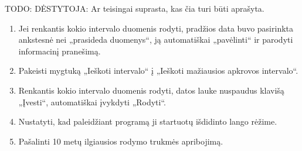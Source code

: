 TODO: DĖSTYTOJA: Ar teisingai suprasta, kas čia turi būti aprašyta.

\begin{enumerate}
  \item Jei renkantis kokio intervalo duomenis rodyti, pradžios data
    buvo pasirinkta ankstesnė nei „prasideda duomenys“, ją automatiškai
    „pavėlinti“ ir parodyti informacinį pranešimą.
  \item Pakeisti mygtuką „Ieškoti intervalo“ į „Ieškoti mažiausios
    apkrovos intervalo“.
  \item Renkantis kokio intervalo duomenis rodyti, datos lauke nuspaudus
    klavišą „Įvesti“, automatiškai įvykdyti „Rodyti“.
  \item Nustatyti, kad paleidžiant programą ji startuotų išdidinto lango
    rėžime.
  \item Pašalinti 10 metų ilgiausios rodymo trukmės apribojimą.
\end{enumerate}
